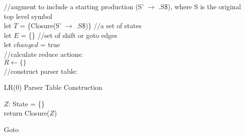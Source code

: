 \documentclass[8pt]{extarticle}
\begin{document}
\begin{multicols*}{2}
  \begin{algorithm}[H]
    //augment to include a starting production (S' $\rightarrow$ .S\$), where S is the original top level symbol\\
    let $T$ = \{Closure(S' $\rightarrow$ .S\$)\} //a set of states\\
    let $E$ = \{\} //set of shift or goto edges\\
    let $changed$ = true\\
    //calculate reduce actions:\\
    $R \leftarrow \{\}$\\
    //construct parser table:\\
    \caption{LR(0) Parser Table Construction\label{Algo_LR0ParserTable}}
  \end{algorithm}

  \begin{algorithm}[H]
    $Z$: State = \{\}\\
    return Closure($Z$)
    \caption{Goto\label{Algo_goto}}
  \end{algorithm}


\end{multicols*}
\end{document}
